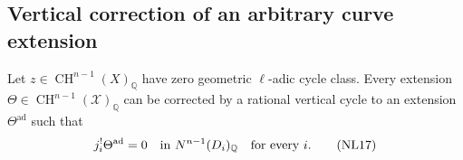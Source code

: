 \subsection{Vertical correction of an arbitrary curve extension}

\begin{proposition}
\label{r12n:admissible}
Let $z\in\operatorname{CH}^{n-1}(X)_{\mathbb Q}$ have zero geometric
$\ell$-adic cycle class.  Every extension
$\Theta\in\operatorname{CH}^{n-1}(\mathcal X)_{\mathbb Q}$ can be
corrected by a rational vertical cycle to an extension
$\Theta^{\mathrm{ad}}$ such that
\[
          j_i^!\Theta^{\mathrm{ad}}=0
              \quad\hbox{in }N^{n-1}(D_i)_{\mathbb Q}
              \quad\hbox{for every }i.
\tag{NL17}\label{r12n:component-zero}
\]
\end{proposition}

